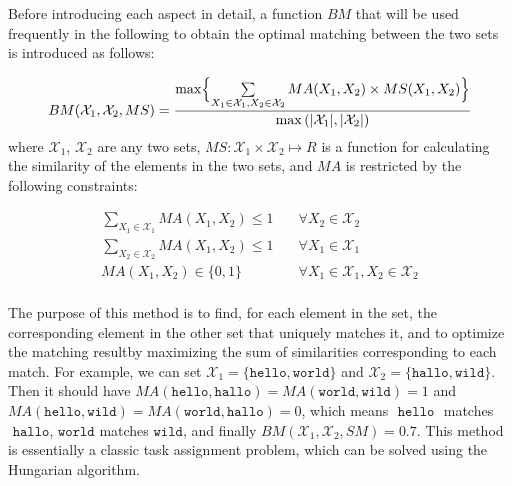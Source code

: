 \documentclass[twoside]{article}
\begin{document}
Before introducing each aspect in detail, a function $BM$ that will be used frequently in the following to obtain the optimal matching between the two sets is introduced as follows:


\begin{equation}
BM(\mathcal{X}_1, \mathcal{X}_2, MS) = \frac{\max\Bigl\{\sum\limits_{X_1 \in \mathcal{X}_1, X_2 \in \mathcal{X}_2}MA(X_1, X_2) \times MS(X_1, X_2)\Bigr\}}{\max{(|\mathcal{X}_1|,|\mathcal{X}_2|)}}
\end{equation}
where $\mathcal{X}_{1}$, $\mathcal{X}_{2}$ are any two sets, $MS: \mathcal{X}_{1} \times \mathcal{X}_{2} \mapsto R$ is a function for calculating the similarity of the elements in the two sets, and $MA$ is restricted by the following constraints:

\begin{equation}
\begin{split}
\sum_{X_{1} \in \mathcal{X}_{1}} M A\left(X_{1}, X_{2}\right) \leqslant 1 \quad &\forall X_{2} \in \mathcal{X}_{2} \\
\sum_{X_{2} \in \mathcal{X}_{2}} M A\left(X_{1}, X_{2}\right) \leqslant 1 \quad &\forall X_{1} \in \mathcal{X}_{1} \\
MA\left(X_{1}, X_{2}\right) \in\{0,1\} \quad &\forall X_{1} \in \mathcal{X}_{1}, X_{2} \in \mathcal{X}_{2}         \\
\end{split}
\end{equation}

The purpose of this method is to find, for each element in the set, the corresponding element in the other set that uniquely matches it, and to optimize the matching resultby maximizing the sum of similarities corresponding to each match.
For example, we can set $\mathcal{X}_1 = \{ \texttt{hello}, \texttt{world} \}$ and $\mathcal{X}_2 = \{ \texttt{hallo}, \texttt{wild} \}$.
Then it should have $MA(\texttt{hello},\texttt{hallo}) = MA(\texttt{world},\texttt{wild}) = 1$ and $MA(\texttt{hello},\texttt{wild}) = MA(\texttt{world},\texttt{hallo}) = 0$, which means $\texttt { hello }$ matches $\texttt { hallo}$, $\texttt {world}$ matches $\texttt {wild}$, and finally $BM(\mathcal{X}_1,\mathcal{X}_2,SM) = 0.7$.
This method is essentially a classic task assignment problem, which can be solved using the Hungarian algorithm\cite{wwy52}.
\end{document}

